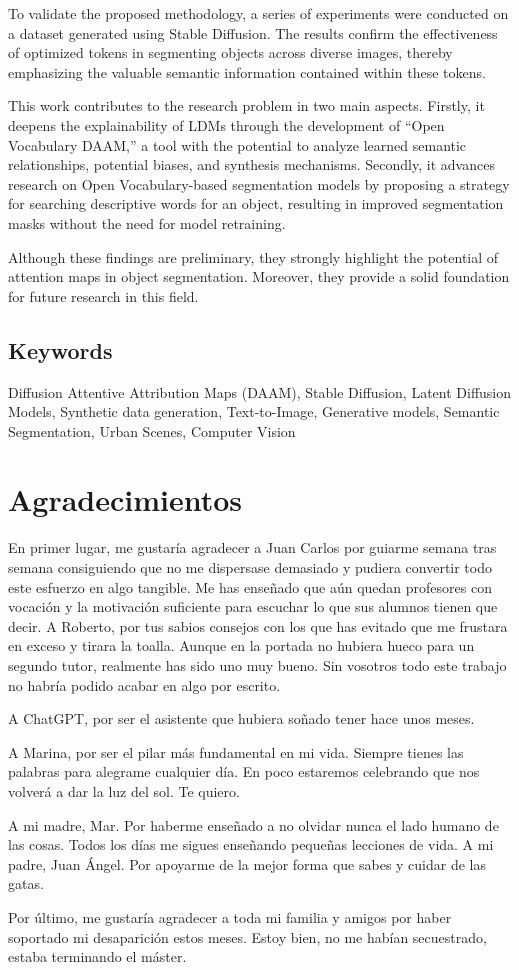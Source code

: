 To validate the proposed methodology, a series of experiments were conducted on a dataset generated using Stable Diffusion. The results confirm the effectiveness of optimized tokens in segmenting objects across diverse images, thereby emphasizing the valuable semantic information contained within these tokens.

This work contributes to the research problem in two main aspects. Firstly, it deepens the explainability of LDMs through the development of ``Open Vocabulary DAAM,'' a tool with the potential to analyze learned semantic relationships, potential biases, and synthesis mechanisms. Secondly, it advances research on Open Vocabulary-based segmentation models by proposing a strategy for searching descriptive words for an object, resulting in improved segmentation masks without the need for model retraining.

Although these findings are preliminary, they strongly highlight the potential of attention maps in object segmentation. Moreover, they provide a solid foundation for future research in this field.


\vfill
\section*{Keywords}
Diffusion Attentive Attribution Maps (DAAM),  Stable Diffusion, Latent Diffusion Models, Synthetic data generation, Text-to-Image, Generative models,  Semantic Segmentation, Urban Scenes, Computer Vision

\newpage
\chapter*{Agradecimientos}


En primer lugar, me gustaría agradecer a Juan Carlos por guiarme semana tras semana consiguiendo que no me 
dispersase demasiado y pudiera convertir todo este esfuerzo en algo tangible.
Me has enseñado que aún quedan profesores con vocación y la motivación suficiente para escuchar 
lo que sus alumnos tienen que decir.
A Roberto, por tus sabios consejos con los que has evitado que me frustara en exceso y tirara la toalla. 
Aunque en la portada no hubiera hueco para un segundo tutor, realmente has sido uno muy bueno.
Sin vosotros todo este trabajo no habría podido acabar en algo por escrito.

A ChatGPT, por ser el asistente que hubiera soñado tener hace unos meses.

A Marina, por ser el pilar más fundamental en mi vida. Siempre tienes las palabras para alegrame cualquier día. 
En poco estaremos celebrando que nos volverá a dar la luz del sol. Te quiero.

A mi madre, Mar. Por haberme enseñado a no olvidar nunca el lado humano de las cosas.
Todos los días me sigues enseñando pequeñas lecciones de vida.
A mi padre, Juan Ángel. Por apoyarme de la mejor forma que sabes y cuidar de las gatas.

Por último, me gustaría agradecer a toda mi familia y amigos por haber soportado mi desaparición estos meses. Estoy bien, no me habían secuestrado, estaba terminando el máster.